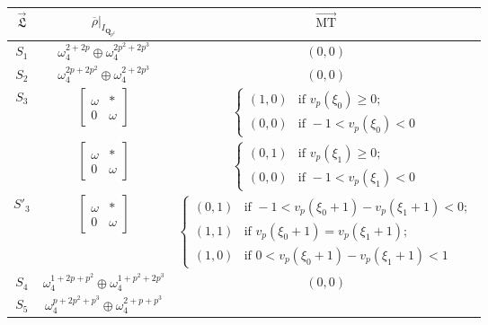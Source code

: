 \documentclass[11pt]{amsart}
\theoremstyle{definition}
\numberwithin{equation}{subsection}
\theoremstyle{plain}
\theoremstyle{plain}
\theoremstyle{plain}
\theoremstyle{plain}
\theoremstyle{plain}
\theoremstyle{plain}
\theoremstyle{plain}
\theoremstyle{plain}
\theoremstyle{plain}
\theoremstyle{plain}
\theoremstyle{plain}
\theoremstyle{plain}
\theoremstyle{definition}
\theoremstyle{definition}
\theoremstyle{definition}
\theoremstyle{remark}
\renewcommand{\(}{\textup{(}}
\renewcommand{\)}{\textup{)}}
\newcommand{\Q}{\mathbf{Q}}
\newcommand{\rhobar}{\overline{\rho}}
\newcommand{\fL}{\mathfrak{L}}
\newcommand{\vL}{\vec{\fL}}
\newcommand{\IQptwo}{{I_{\Q_{p^2}}}}
\begin{document}
\begin{table}[htbp]
    \centering
    \begin{tabular}{|c||c|c|}
    \hline
        $\vL$ & $\rhobar|_\IQptwo$ & $\vec{\mathrm{MT}}$ \\\hline\hline
    $S_1$
            & $\omega_4^{2+2p}\oplus\omega_4^{2p^2+2p^3}$
            & $(0,0)$ \\\hline
    $S_2$
            & $\omega_4^{2p+2p^2}\oplus\omega_4^{2+2p^3}$
            & $(0,0)$ \\\hline
    \multirow{2}{*}[-0.5em]{$S_3$}
        & $
        \begin{bmatrix}
            \omega & * \\ 0 & \omega
        \end{bmatrix}
        $
        & $
        \begin{cases}
            (1,0) & \mbox{if } v_p(\xi_0)\geq 0;\\
            (0,0) & \mbox{if } -1<v_p(\xi_0)<0
        \end{cases}
        $ \\\cline{2-3}
        & $
        \begin{bmatrix}
            \omega & * \\ 0 & \omega
        \end{bmatrix}
        $
        & $
        \begin{cases}
            (0,1) & \mbox{if } v_p(\xi_1)\geq 0;\\
            (0,0) & \mbox{if } -1<v_p(\xi_1)<0
        \end{cases}$ \\\hline
    $S'_3$
        &
        $
        \begin{bmatrix}
            \omega & * \\ 0 & \omega
        \end{bmatrix}
        $
        & 
        $
        \begin{cases}
            (0,1) &\mbox{if } -1<v_p(\xi_0+1)-v_p(\xi_1+1)<0; \\
            (1,1) &\mbox{if } v_p(\xi_0+1)=v_p(\xi_1+1);\\
            (1,0) &\mbox{if }0<v_p(\xi_0+1)-v_p(\xi_1+1)<1 
        \end{cases}
        $
        \\\hline
    $S_4$
            & $\omega_4^{1+2p+p^2}\oplus\omega_4^{1+p^2+2p^3}$
            & $(0,0)$ \\\hline
    $S_5$
            & $\omega_4^{p+2p^2+p^3}\oplus\omega_4^{2+p+p^3}$

\end{tabular}
\end{table}
\end{document}
